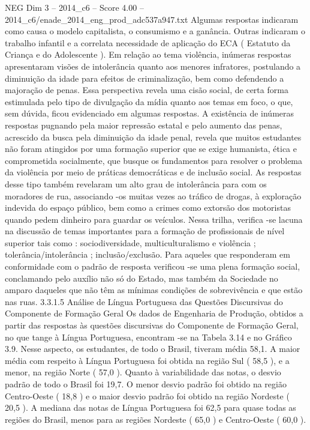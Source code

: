 \begin{textsample}{NEG Dim 3 – 2014\_c6 – Score 4.00 – 2014\_c6/enade\_2014\_eng\_prod\_adc537a947.txt}
Algumas respostas indicaram como causa o modelo capitalista, o consumismo e a ganância.
Outras indicaram o trabalho infantil e a correlata necessidade de aplicação do ECA ( Estatuto da Criança e do Adolescente ).
Em relação ao tema violência, inúmeras respostas apresentaram visões de intolerância quanto aos menores infratores, postulando a diminuição da idade para efeitos de criminalização, bem como defendendo a majoração de penas.
Essa perspectiva revela uma cisão social, de certa forma estimulada pelo tipo de divulgação da mídia quanto aos temas em foco, o que, sem dúvida, ficou evidenciado em algumas respostas.
A existência de inúmeras respostas pugnando pela maior repressão estatal e pelo aumento das penas, acrescido da busca pela diminuição da idade penal, revela que muitos estudantes não foram atingidos por uma formação superior que se exige humanista, ética e comprometida socialmente, que busque os fundamentos para resolver o problema da violência por meio de práticas democráticas e de inclusão social.
As respostas desse tipo também revelaram um alto grau de intolerância para com os moradores de rua, associando -os muitas vezes ao tráfico de drogas, à exploração indevida do espaço público, bem como a crimes como extorsão dos motoristas quando pedem dinheiro para guardar os veículos.
Nessa trilha, verifica -se lacuna na discussão de temas importantes para a formação de profissionais de nível superior tais como : sociodiversidade, multiculturalismo e violência ; tolerância/intolerância ; inclusão/exclusão.
Para aqueles que responderam em conformidade com o padrão de resposta verificou -se uma plena formação social, conclamando pelo auxílio não só do Estado, mas também da Sociedade no amparo daqueles que não têm as mínimas condições de sobrevivência e que estão nas ruas. 3.3.1.5 Análise de Língua Portuguesa das Questões Discursivas do Componente de Formação Geral Os dados de Engenharia de Produção, obtidos a partir das respostas às questões discursivas do Componente de Formação Geral, no que tange à Língua Portuguesa, encontram -se na Tabela 3.14 e no Gráfico 3.9.
Nesse aspecto, os estudantes, de todo o Brasil, tiveram média 58,1.
A maior média com respeito à Língua Portuguesa foi obtida na região Sul ( 58,5 ), e a menor, na região Norte ( 57,0 ).
Quanto à variabilidade das notas, o desvio padrão de todo o Brasil foi 19,7.
O menor desvio padrão foi obtido na região Centro-Oeste ( 18,8 ) e o maior desvio padrão foi obtido na região Nordeste ( 20,5 ).
A mediana das notas de Língua Portuguesa foi 62,5 para quase todas as regiões do Brasil, menos para as regiões Nordeste ( 65,0 ) e Centro-Oeste ( 60,0 ).

\end{textsample}
